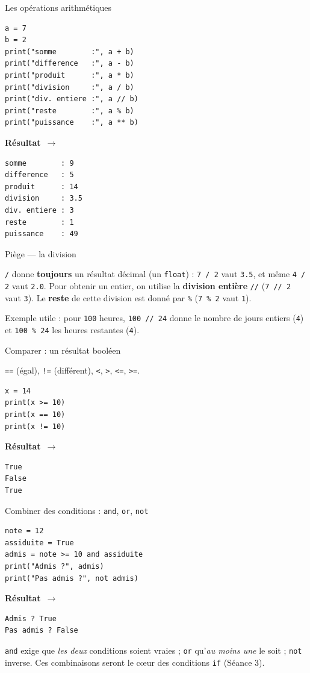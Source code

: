 \documentclass[aspectratio=169,11pt]{beamer}
\newcommand{\resultat}{{\scriptsize\textbf{R\'esultat}~$\rightarrow$}\par\vspace{1pt}}
\begin{document}
\begin{frame}[fragile]{Les opérations arithmétiques}
\begin{lstlisting}
a = 7
b = 2
print("somme        :", a + b)
print("difference   :", a - b)
print("produit      :", a * b)
print("division     :", a / b)
print("div. entiere :", a // b)
print("reste        :", a % b)
print("puissance    :", a ** b)
\end{lstlisting}
\resultat
\begin{lstlisting}[style=out]
somme        : 9
difference   : 5
produit      : 14
division     : 3.5
div. entiere : 3
reste        : 1
puissance    : 49
\end{lstlisting}
\end{frame}

\begin{frame}{Piège — la division}
\begin{ucadpiege}
{\small \texttt{/} donne \textbf{toujours} un résultat décimal (un \texttt{float}) : \texttt{7 / 2} vaut \texttt{3.5}, et même \texttt{4 / 2} vaut \texttt{2.0}. Pour obtenir un entier, on utilise la \textbf{division entière} \texttt{//} (\texttt{7 // 2} vaut \texttt{3}). Le \textbf{reste} de cette division est donné par \texttt{\%} (\texttt{7 \% 2} vaut \texttt{1}).}
\end{ucadpiege}
{\small Exemple utile : pour \texttt{100} heures, \texttt{100 // 24} donne le nombre de jours entiers (\texttt{4}) et \texttt{100 \% 24} les heures restantes (\texttt{4}).}
\end{frame}

\begin{frame}[fragile]{Comparer : un résultat booléen}
\begin{ucadex}
{\small \texttt{==} (égal), \texttt{!=} (différent), \texttt{<}, \texttt{>}, \texttt{<=}, \texttt{>=}.}
\end{ucadex}
\begin{lstlisting}
x = 14
print(x >= 10)
print(x == 10)
print(x != 10)
\end{lstlisting}
\resultat
\begin{lstlisting}[style=out]
True
False
True
\end{lstlisting}
\end{frame}

\begin{frame}[fragile]{Combiner des conditions : \texttt{and}, \texttt{or}, \texttt{not}}
\begin{lstlisting}
note = 12
assiduite = True
admis = note >= 10 and assiduite
print("Admis ?", admis)
print("Pas admis ?", not admis)
\end{lstlisting}
\resultat
\begin{lstlisting}[style=out]
Admis ? True
Pas admis ? False
\end{lstlisting}
{\small \texttt{and} exige que \emph{les deux} conditions soient vraies ; \texttt{or} qu'\emph{au moins une} le soit ; \texttt{not} inverse. Ces combinaisons seront le cœur des conditions \texttt{if} (Séance 3).}
\end{frame}
\end{document}
